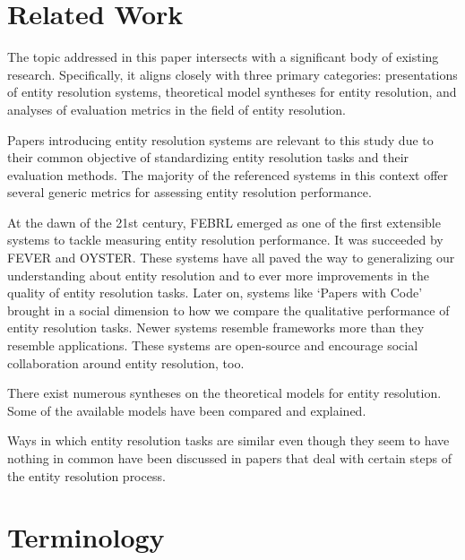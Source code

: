 \documentclass[11pt]{article}
\begin{document}
    \section{Related Work}\label{sec:related}
    
    The topic addressed in this paper intersects with a significant body of
    existing research.
    Specifically, it aligns closely with three primary categories: presentations
    of entity resolution systems, theoretical model syntheses for entity
    resolution, and analyses of evaluation metrics in the field of entity
    resolution.

    Papers introducing entity resolution systems are relevant to this study due
    to their common objective of standardizing entity resolution tasks and their
    evaluation methods.
    The majority of the referenced systems in this context offer several generic
    metrics for assessing entity resolution performance.

    At the dawn of the 21st century, FEBRL\cite{febrl2002} emerged as one of the
    first extensible systems to tackle measuring entity resolution performance.
    It was succeeded by FEVER\cite{fever2009} and OYSTER\cite{oyster2012}. 
    These systems have all paved the way to generalizing our understanding about
    entity resolution and to ever more improvements in the quality of entity
    resolution tasks.
    Later on, systems like `Papers with Code'\cite{papwithcode2019} brought in
    a social dimension to how we compare the qualitative performance of entity
    resolution tasks.
    Newer systems resemble frameworks more than they resemble
    applications\cite{magellan2020,jedai2017}.
    These systems are open-source and encourage social collaboration around
    entity resolution, too.
    
    There exist numerous syntheses on the theoretical models for entity
    resolution\cite{fs1969,Ben2009Swoosh,Tal11}.
    Some of the available models have been compared and
    explained\cite{Tal11,tal2013}.

    Ways in which entity resolution tasks are similar even though they seem
    to have nothing in common have been discussed in papers that deal with
    certain steps of the entity resolution process\cite{Pap19,Chen09}.

    \section{Terminology}\label{sec:terminology}
\end{document}
